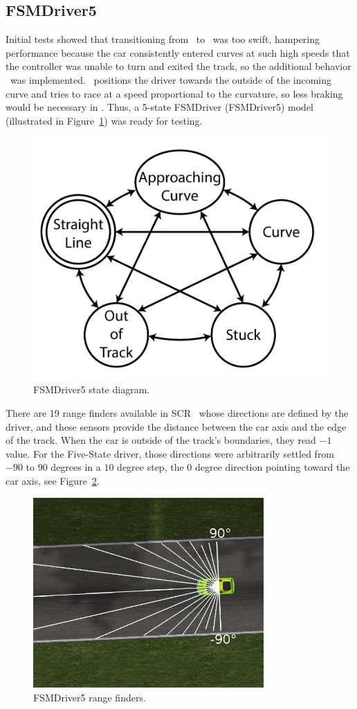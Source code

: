 \subsection{FSMDriver5}

Initial tests showed that transitioning from \SL~to \C~was too swift, hampering performance because the car consistently entered curves at such high speeds that the controller was unable to turn and exited the track, so the additional behavior \AC~was implemented. \AC~positions the driver towards the outside of the incoming curve and tries to race at a speed proportional to the curvature, so less braking would be necessary in \C. Thus, a 5-state FSMDriver (FSMDriver5) model (illustrated in Figure~\ref{Fig:FSM5Diagram}) was ready for testing.

\begin{figure}[h]
	\centering
	\includegraphics[width=.45\textwidth]{FiveStateFSM}
	\caption{FSMDriver5 state diagram.}
	\label{Fig:FSM5Diagram}
\end{figure}


There are 19 range finders available in SCR~\cite{SCR} whose directions are defined by the driver, and these sensors provide the distance between the car axis and the edge of the track. When the car is outside of the track's boundaries, they read $-1$ value. For the Five-State driver, those directions were arbitrarily settled from $-90$ to $90$ degrees in a $10$ degree step, the $0$ degree direction pointing toward the car axis, see Figure~\ref{Fig:FSM5Sensors}.

\begin{figure}[h]
	\centering
	\includegraphics[width=250pt]{FSM5Sensors}
	\caption{FSMDriver5 range finders.}
	\label{Fig:FSM5Sensors}
\end{figure}

